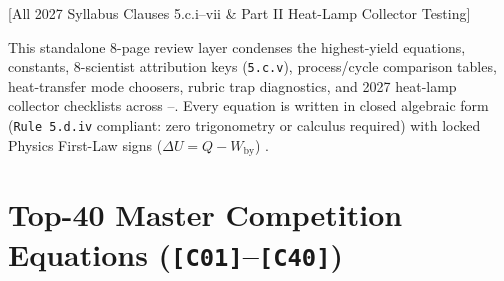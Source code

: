 [All 2027 Syllabus Clauses 5.c.i--vii \& Part II Heat-Lamp Collector Testing]


This standalone 8-page review layer condenses the highest-yield equations, constants, 8-scientist attribution keys (\texttt{5.c.v}), process/cycle comparison tables, heat-transfer mode choosers, rubric trap diagnostics, and 2027 heat-lamp collector checklists across --. Every equation is written in closed algebraic form (\texttt{Rule 5.d.iv} compliant: zero trigonometry or calculus required) with locked Physics First-Law signs ($\Delta U = Q - W_{\mathrm{by}}$) .

\section{Top-40 Master Competition Equations (\texttt{[C01]}--\texttt{[C40]})}\label{sec:23.1}

